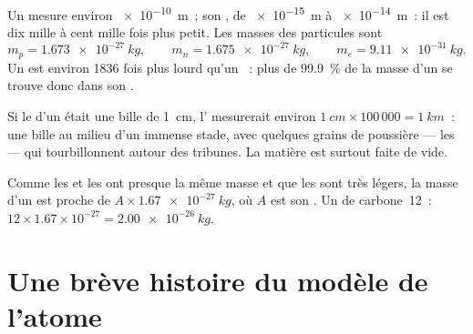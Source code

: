 \begin{proposition}\label{prop:g9:inside-the-atom:sizes}
Un  mesure environ \qty{e-10}{m}~; son , de \qty{e-15}{m} à
\qty{e-14}{m}~: il est dix mille à cent mille fois plus petit. Les masses
des particules sont
\[
  m_p = \qty{1.673e-27}{kg},\qquad m_n = \qty{1.675e-27}{kg},\qquad
  m_e = \qty{9.11e-31}{kg}.
\]
Un  est environ 1836 fois plus lourd qu'un ~: plus de
\qty{99.9}{\percent} de la masse d'un  se trouve donc dans son
.
\end{proposition}

\begin{example}\label{ex:g9:inside-the-atom:marble}
Si le  d'un  était une bille de \qty{1}{cm}, l'
mesurerait environ $\qty{1}{cm} \times 100\,000 = \qty{1}{km}$~: une
bille au milieu d'un immense stade, avec quelques grains de poussière
--- les  --- qui tourbillonnent autour des tribunes. La matière
est surtout faite de vide.
\end{example}

\begin{method}\label{met:g9:inside-the-atom:mass}
Comme les  et les  ont presque la même masse et que les
 sont très légers, la masse d'un  est proche de $A \times
\qty{1.67e-27}{kg}$, où $A$ est son . Un  de
carbone~12~: $12 \times 1.67 \times 10^{-27} = \qty{2.00e-26}{kg}$.
\end{method}

\section{Une brève histoire du modèle de l'atome}

